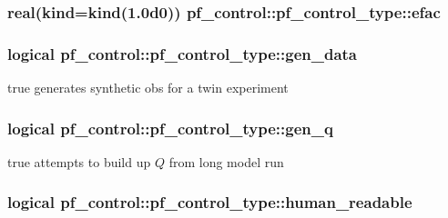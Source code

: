 \hypertarget{structpf__control_1_1pf__control__type_a105254bf19b7d9582f187d6fefe3b8eb}{
\subsubsection[{efac}]{\setlength{\rightskip}{0pt plus 5cm}real(kind=kind(1.\-0d0)) pf\-\_\-control\-::pf\-\_\-control\-\_\-type\-::efac}}\label{structpf__control_1_1pf__control__type_a105254bf19b7d9582f187d6fefe3b8eb}
\hypertarget{structpf__control_1_1pf__control__type_a250ef33de2e01234ed341b9864338b7d}{
\subsubsection[{gen\-\_\-data}]{\setlength{\rightskip}{0pt plus 5cm}logical pf\-\_\-control\-::pf\-\_\-control\-\_\-type\-::gen\-\_\-data}}\label{structpf__control_1_1pf__control__type_a250ef33de2e01234ed341b9864338b7d}


true generates synthetic obs for a twin experiment 

\hypertarget{structpf__control_1_1pf__control__type_ae1e2616b063090ccd403e0f1c7820fce}{
\subsubsection[{gen\-\_\-q}]{\setlength{\rightskip}{0pt plus 5cm}logical pf\-\_\-control\-::pf\-\_\-control\-\_\-type\-::gen\-\_\-q}}\label{structpf__control_1_1pf__control__type_ae1e2616b063090ccd403e0f1c7820fce}


true attempts to build up $Q$ from long model run 

\hypertarget{structpf__control_1_1pf__control__type_a8b7974924f8883cc71d3fd7d3ef66a9b}{
\subsubsection[{human\-\_\-readable}]{\setlength{\rightskip}{0pt plus 5cm}logical pf\-\_\-control\-::pf\-\_\-control\-\_\-type\-::human\-\_\-readable}}\label{structpf__control_1_1pf__control__type_a8b7974924f8883cc71d3fd7d3ef66a9b}


